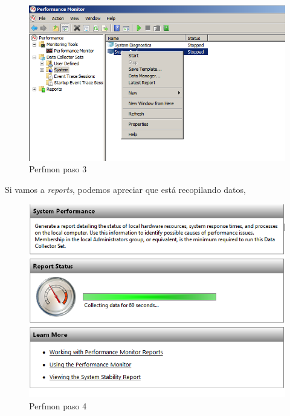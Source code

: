 \begin{figure}[H] %
	\centering
	\includegraphics[scale=0.5]{pics/perfmon3.png}  %
	\caption{Perfmon paso 3} \label{fig:perfmon3}
\end{figure}

Si vamos a \textit{reports}, podemos apreciar que está recopilando datos,

\begin{figure}[H] %
	\centering
	\includegraphics[scale=0.5]{pics/perfmon4.png}  %
	\caption{Perfmon paso 4} \label{fig:perfmon4}
\end{figure}

